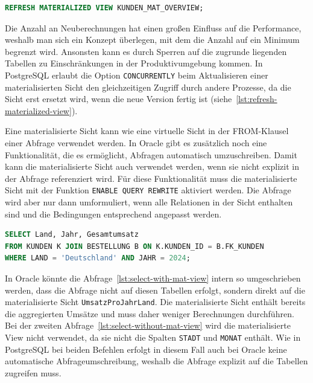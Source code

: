 \vspace{-5pt}
\begin{lstlisting}[language=SQL,caption=Aktualisierung der materialisierten Sicht,label={lst:refresh-materialized-view}]
REFRESH MATERIALIZED VIEW KUNDEN_MAT_OVERVIEW;
\end{lstlisting}
\vspace{-5pt}

Die Anzahl an Neuberechnungen hat einen großen Einfluss auf die Performance, weshalb man sich ein Konzept überlegen, mit dem die Anzahl auf ein Minimum begrenzt wird.
Ansonsten kann es durch Sperren auf die zugrunde liegenden Tabellen zu Einschränkungen in der Produktivumgebung kommen.
In PostgreSQL erlaubt die Option \texttt{CONCURRENTLY} beim Aktualisieren einer materialisierten Sicht den gleichzeitigen Zugriff durch andere Prozesse, da die Sicht erst ersetzt wird, wenn die neue Version fertig ist (siehe~\ref{lst:refresh-materialized-view}).

Eine materialisierte Sicht kann wie eine virtuelle Sicht in der FROM-Klausel einer Abfrage verwendet werden.
In Oracle gibt es zusätzlich noch eine Funktionalität, die es ermöglicht, Abfragen automatisch umzuschreiben.
Damit kann die materialisierte Sicht auch verwendet werden, wenn sie nicht explizit in der Abfrage referenziert wird.
Für diese Funktionalität muss die materialisierte Sicht mit der Funktion \texttt{ENABLE QUERY REWRITE} aktiviert werden.
Die Abfrage wird aber nur dann umformuliert, wenn alle Relationen in der Sicht enthalten sind und die Bedingungen entsprechend angepasst werden.

\vspace{-5pt}
\begin{lstlisting}[language=SQL,caption=Select mit View,label={lst:select-with-mat-view}]
SELECT Land, Jahr, Gesamtumsatz
FROM KUNDEN K JOIN BESTELLUNG B ON K.KUNDEN_ID = B.FK_KUNDEN
WHERE LAND = 'Deutschland' AND JAHR = 2024;
\end{lstlisting}
\vspace{-5pt}

In Oracle könnte die Abfrage~\ref{lst:select-with-mat-view} intern so umgeschrieben werden, dass die Abfrage nicht auf diesen Tabellen erfolgt, sondern direkt auf die materialisierte Sicht \texttt{UmsatzProJahrLand}.
Die materialisierte Sicht enthält bereits die aggregierten Umsätze und muss daher weniger Berechnungen durchführen.
Bei der zweiten Abfrage~\ref{lst:select-without-mat-view} wird die materialisierte View nicht verwendet, da sie nicht die Spalten \texttt{STADT} und \texttt{MONAT} enthält.
Wie in PostgreSQL bei beiden Befehlen erfolgt in diesem Fall auch bei Oracle keine automatische Abfrageumschreibung, weshalb die Abfrage explizit auf die Tabellen zugreifen muss.


